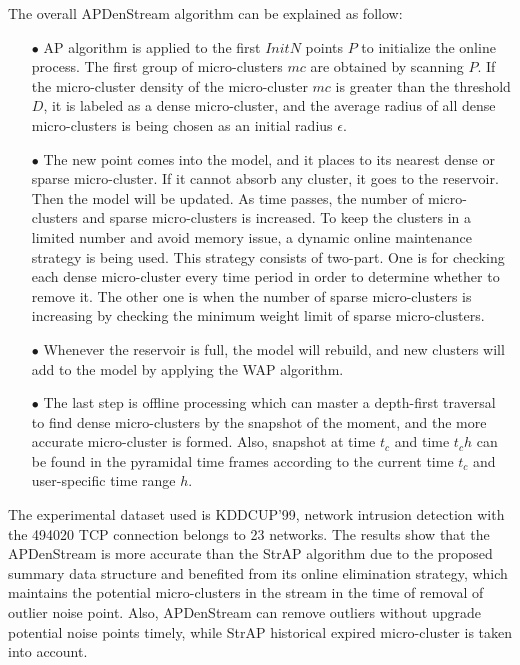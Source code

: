 The overall APDenStream algorithm can be explained as follow:

\begin{itemize}
    \item[$\bullet$] AP algorithm is applied to the first $InitN$ points $P$ to initialize the online process. The first group of micro-clusters $mc$ are obtained by scanning $P$. If the micro-cluster density of the micro-cluster $mc$ is greater than the threshold $D$, it is labeled as a dense micro-cluster, and the average radius of all dense micro-clusters is being chosen as an initial radius $\epsilon$.
    
    \item[$\bullet$] The new point comes into the model, and it places to its nearest dense or sparse micro-cluster. If it cannot absorb any cluster, it goes to the reservoir. Then the model will be updated. As time passes, the number of micro-clusters and sparse micro-clusters is increased. To keep the clusters in a limited number and avoid memory issue, a dynamic online maintenance strategy is being used.  This strategy consists of two-part. One is for checking each dense micro-cluster every time period in order to determine whether to remove it. The other one is when the number of sparse micro-clusters is increasing by checking the minimum weight limit of sparse micro-clusters. 

    \item[$\bullet$] Whenever the reservoir is full, the model will rebuild, and new clusters will add to the model by applying the WAP algorithm.     
    
   \item[$\bullet$] The last step is offline processing which can master a depth-first traversal to find dense micro-clusters by the snapshot of the moment, and the more accurate micro-cluster is formed. Also, snapshot at time $t_c$ and time $t_ch$ can be found in the pyramidal time frames according to the current time $t_c$ and user-specific time range $h$. 
\end{itemize}



The experimental dataset used is KDDCUP'99, network intrusion detection with the 494020 TCP connection belongs to 23 networks. The results show that the APDenStream is more accurate than the StrAP algorithm due to the proposed summary data structure and benefited from its online elimination strategy, which maintains the potential micro-clusters in the stream in the time of removal of outlier noise point.
Also, APDenStream can remove outliers without upgrade potential noise points timely, while StrAP historical expired micro-cluster is taken into account.



